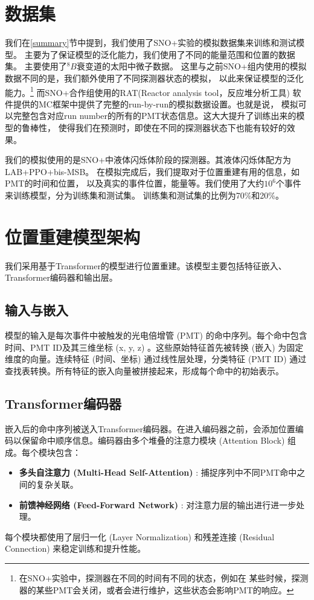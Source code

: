 \section{数据集}\label{dataset}

我们在\ref{summary}节中提到，我们使用了SNO+实验的模拟数据集来训练和测试模型。
主要为了保证模型的泛化能力，我们使用了不同的能量范围和位置的数据集。
主要使用了${}^{8}B$衰变道的太阳中微子数据。
这里与之前SNO+组内使用的模拟数据不同的是，我们额外使用了不同探测器状态的模拟，
以此来保证模型的泛化能力。\footnote{在SNO+实验中，探测器在不同的时间有不同的状态，例如在
某些时候，探测器的某些PMT会关闭，或者会进行维护，这些状态会影响PMT的响应。}
而SNO+合作组使用的RAT(Reactor analysis tool，反应堆分析工具)
软件提供的MC框架中提供了完整的run-by-run的模拟数据设置。也就是说，
模拟可以完整包含对应run number的所有的PMT状态信息。这大大提升了训练出来的模型的鲁棒性，
使得我们在预测时，即使在不同的探测器状态下也能有较好的效果。

我们的模拟使用的是SNO+中液体闪烁体阶段的探测器。其液体闪烁体配方为LAB+PPO+bis-MSB。
在模拟完成后，我们提取对于位置重建有用的信息，如PMT的时间和位置，
以及真实的事件位置，能量等。我们使用了大约$10^6$个事件来训练模型，分为训练集和测试集。
训练集和测试集的比例为70\%和20\%。

\section{位置重建模型架构}\label{model_architecture}

我们采用基于Transformer的模型进行位置重建。该模型主要包括特征嵌入、Transformer编码器和输出层。

\subsection{输入与嵌入}
模型的输入是每次事件中被触发的光电倍增管 (PMT) 的命中序列。每个命中包含时间、PMT ID及其三维坐标 (x, y, z) 。这些原始特征首先被转换 (嵌入) 为固定维度的向量。连续特征 (时间、坐标) 通过线性层处理，分类特征 (PMT ID) 通过查找表转换。所有特征的嵌入向量被拼接起来，形成每个命中的初始表示。

\subsection{Transformer编码器}
嵌入后的命中序列被送入Transformer编码器。在进入编码器之前，会添加位置编码以保留命中顺序信息。编码器由多个堆叠的注意力模块 (Attention Block) 组成。每个模块包含：
\begin{itemize}
    \item \textbf{多头自注意力 (Multi-Head Self-Attention) }: 捕捉序列中不同PMT命中之间的复杂关联。
    \item \textbf{前馈神经网络 (Feed-Forward Network) }: 对注意力层的输出进行进一步处理。
\end{itemize}
每个模块都使用了层归一化 (Layer Normalization) 和残差连接 (Residual Connection) 来稳定训练和提升性能。

